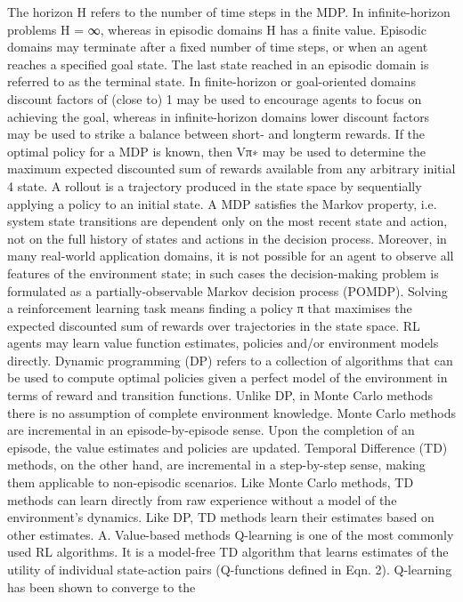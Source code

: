 The horizon H refers to the number of time steps in the
MDP. In infinite-horizon problems H = ∞, whereas in episodic
domains H has a finite value. Episodic domains may terminate
after a fixed number of time steps, or when an agent reaches
a specified goal state. The last state reached in an episodic
domain is referred to as the terminal state. In finite-horizon
or goal-oriented domains discount factors of (close to) 1 may
be used to encourage agents to focus on achieving the goal,
whereas in infinite-horizon domains lower discount factors
may be used to strike a balance between short- and longterm rewards. If the optimal policy for a MDP is known,
then Vπ∗ may be used to determine the maximum expected
discounted sum of rewards available from any arbitrary initial
4
state. A rollout is a trajectory produced in the state space
by sequentially applying a policy to an initial state. A MDP
satisfies the Markov property, i.e. system state transitions are
dependent only on the most recent state and action, not on
the full history of states and actions in the decision process.
Moreover, in many real-world application domains, it is not
possible for an agent to observe all features of the environment
state; in such cases the decision-making problem is formulated
as a partially-observable Markov decision process (POMDP).
Solving a reinforcement learning task means finding a policy
π that maximises the expected discounted sum of rewards
over trajectories in the state space. RL agents may learn
value function estimates, policies and/or environment models
directly. Dynamic programming (DP) refers to a collection of
algorithms that can be used to compute optimal policies given
a perfect model of the environment in terms of reward and
transition functions. Unlike DP, in Monte Carlo methods there
is no assumption of complete environment knowledge. Monte
Carlo methods are incremental in an episode-by-episode sense.
Upon the completion of an episode, the value estimates and
policies are updated. Temporal Difference (TD) methods, on
the other hand, are incremental in a step-by-step sense, making
them applicable to non-episodic scenarios. Like Monte Carlo
methods, TD methods can learn directly from raw experience
without a model of the environment’s dynamics. Like DP, TD
methods learn their estimates based on other estimates.
A. Value-based methods
Q-learning is one of the most commonly used RL algorithms. It is a model-free TD algorithm that learns estimates of
the utility of individual state-action pairs (Q-functions defined
in Eqn. 2). Q-learning has been shown to converge to the
